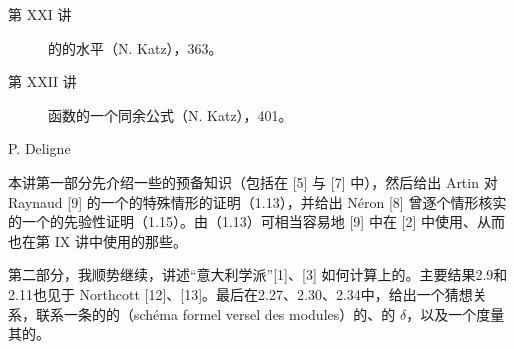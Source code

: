 \begin{description}
\item[第 XXI 讲] 的的水平（N. Katz），363。
\item[第 XXII 讲] 函数的一个同余公式（N. Katz），401。
\end{description}
\begin{center}P. Deligne\end{center}
本讲第一部分先介绍一些的预备知识（包括在 [5] 与 [7] 中），然后给出 Artin 对 Raynaud [9] 的一个的特殊情形的证明（1.13），并给出 Néron [8] 曾逐个情形核实的一个的先验性证明（1.15）。由（1.13）可相当容易地 [9] 中在 [2] 中使用、从而也在第 IX 讲中使用的那些。

第二部分，我顺势继续，讲述“意大利学派”[1]、[3] 如何计算上的。主要结果2.9和2.11也见于 Northcott [12]、[13]。最后在2.27、2.30、2.34中，给出一个猜想关系，联系一条的的（schéma formel versel des modules）的、的 $\delta$，以及一个度量其的。

